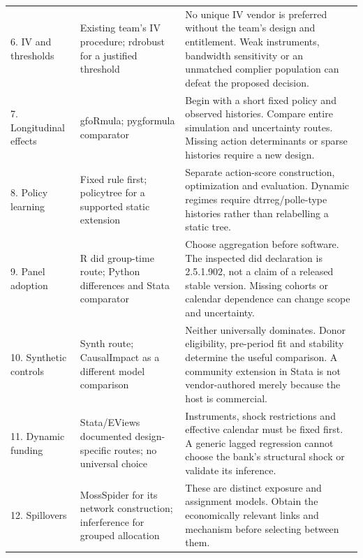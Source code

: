 \begin{longtable}{P{2.2cm}P{4.3cm}P{7.7cm}}
6. IV and thresholds & Existing team's IV procedure; rdrobust for a justified threshold & No unique IV vendor is preferred without the team's design and entitlement. Weak instruments, bandwidth sensitivity or an unmatched complier population can defeat the proposed decision. \citep{exec13_ivrd_stata,exec13_ivrd_sas,exec13_ivrd_rdrobust}\\[5pt]
7. Longitudinal effects & gfoRmula; pygformula comparator & Begin with a short fixed policy and observed histories. Compare entire simulation and uncertainty routes. Missing action determinants or sparse histories require a new design. \citep{exec20_gformula_reuse,exec24_longpy_pygformula_source}\\[5pt]
8. Policy learning & Fixed rule first; policytree for a supported static extension & Separate action-score construction, optimization and evaluation. Dynamic regimes require dtrreg/polle-type histories rather than relabelling a static tree. \citep{exec24_policiesr_policytree,exec24_policiesr_dtrreg,exec24_policiesr_polle}\\[5pt]
9. Panel adoption & R did group-time route; Python differences and Stata comparator & Choose aggregation before software. The inspected did declaration is 2.5.1.902, not a claim of a released stable version. Missing cohorts or calendar dependence can change scope and uncertainty. \citep{exec24_panelr_did,exec24_panelpy_differences,exec18_gp_stata_xthdid}\\[5pt]
10. Synthetic controls & Synth route; CausalImpact as a different model comparison & Neither universally dominates. Donor eligibility, pre-period fit and stability determine the useful comparison. A community extension in Stata is not vendor-authored merely because the host is commercial. \citep{exec19_synth_stata_source,exec13_ci_r,exec13_ci_semantics}\\[5pt]
11. Dynamic funding & Stata/EViews documented design-specific routes; no universal choice & Instruments, shock restrictions and effective calendar must be fixed first. A generic lagged regression cannot choose the bank's structural shock or validate its inference. \citep{exec19_dynamic_stata_ab,exec19_dynamic_stata_system,exec19_dynamic_stata_lp,exec19_dynamic_eviews_panel}\\[5pt]
12. Spillovers & MossSpider for its network construction; inferference for grouped allocation & These are distinct exposure and assignment models. Obtain the economically relevant links and mechanism before selecting between them. \citep{exec24_interference_mossspider,exec24_interference_inferference}\\[5pt]

\end{longtable}
